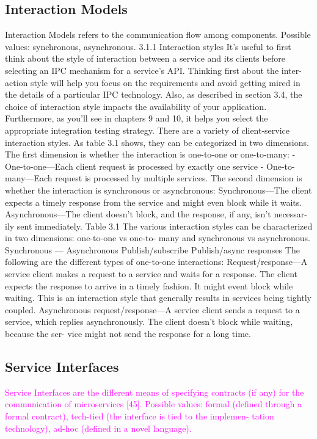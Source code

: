 \documentclass[thesis=M,english,hidelinks]{FITthesis}[2012/10/20]
\begin{document}
\subsection{Interaction Models}
Interaction Models refers to the communication flow among components. Possible values: synchronous, asynchronous.
3.1.1 Interaction styles
It’s useful to first think about the style of interaction between a service and its clients before selecting an IPC mechanism for a service’s API. Thinking first about the inter- action style will help you focus on the requirements and avoid getting mired in the details of a particular IPC technology. Also, as described in section 3.4, the choice of interaction style impacts the availability of your application. Furthermore, as you’ll see in chapters 9 and 10, it helps you select the appropriate integration testing strategy.
There are a variety of client-service interaction styles. As table 3.1 shows, they can be categorized in two dimensions. The first dimension is whether the interaction is one-to-one or one-to-many:
- One-to-one—Each client request is processed by exactly one service
- One-to-many—Each request is processed by multiple services.
The second dimension is whether the interaction is synchronous or asynchronous:
Synchronous—The client expects a timely response from the service and might even block while it waits.
Asynchronous—The client doesn’t block, and the response, if any, isn’t necessar- ily sent immediately.
Table 3.1 The various interaction styles can be characterized in two dimensions: one-to-one vs one-to- many and synchronous vs asynchronous.
Synchronous —
Asynchronous Publish/subscribe Publish/async responses
The following are the different types of one-to-one interactions:
Request/response—A service client makes a request to a service and waits for a response. The client expects the response to arrive in a timely fashion. It might event block while waiting. This is an interaction style that generally results in services being tightly coupled.
Asynchronous request/response—A service client sends a request to a service, which replies asynchronously. The client doesn’t block while waiting, because the ser- vice might not send the response for a long time.



\subsection{Service Interfaces}
\textcolor{magenta}{Service Interfaces are the different means of specifying contracts (if any) for the communication of microservices [45]. Possible values: formal (defined through a formal contract), tech-tied (the interface is tied to the implemen- tation technology), ad-hoc (defined in a novel language).}
\end{document}
